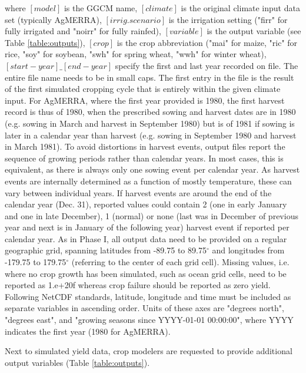 \documentclass[gmd, manuscript]{copernicus} %
\begin{document}
\noindent where $[model]$ is the GGCM name, $[climate]$ is the original climate input data set (typically AgMERRA), $[irrig.scenario]$ is the irrigation setting ("firr" for fully irrigated and "noirr" for fully rainfed), $[variable]$ is the output variable (see Table \ref{table:outputs}), $[crop]$ is the crop abbreviation ("mai" for maize, "ric" for rice, "soy" for soybean, "swh" for spring wheat, "wwh" for winter wheat), $[start-year]\_[end-year]$ specify the first and last year recorded on file. 
The entire file name needs to be in small caps. 
The first entry in the file is the result of the first simulated cropping cycle that is entirely within the given climate input. 
For AgMERRA, where the first year provided is 1980, the first harvest record is thus of 1980, when the prescribed sowing and harvest dates are in 1980 (e.g. sowing in March and harvest in September 1980) but is of 1981 if sowing is later in a calendar year than harvest (e.g. sowing in September 1980 and harvest in March 1981). 
To avoid distortions in harvest events, output files report the sequence of growing periods rather than calendar years. 
In most cases, this is equivalent, as there is always only one sowing event per calendar year.
As harvest events are internally determined as a function of mostly temperature, these can vary between individual years. 
If harvest events are around the end of the calendar year (Dec. 31), reported values could contain 2 (one in early January and one in late December), 1 (normal) or none (last was in December of previous year and next is in January of the following year) harvest event if reported per calendar year.
As in Phase I, all output data need to be provided on a regular geographic grid, spanning latitudes from -89.75 to 89.75$^{\circ}$ and longitudes from -179.75 to 179.75$^{\circ}$ (referring to the center of each grid cell). 
Missing values, i.e. where no crop growth has been simulated, such as ocean grid cells, need to be reported as 1.e+20f whereas crop failure should be reported as zero yield. 
Following NetCDF standards, latitude, longitude and time must be included as separate variables in ascending order.
Units of these axes are "degrees north", "degrees east", and "growing seasons since YYYY-01-01 00:00:00", where YYYY indicates the first year (1980 for AgMERRA).

Next to simulated yield data, crop modelers are requested to provide additional output variables (Table \ref{table:outputs}). 
\end{document}
